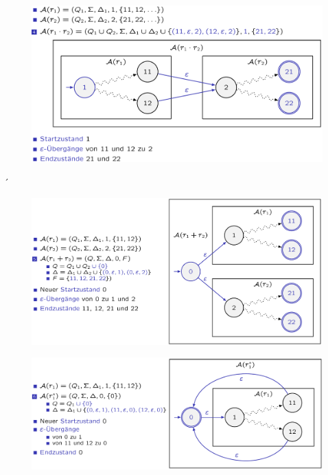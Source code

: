 \documentclass[12pt,a4paper]{article}
\begin{document}
\begin{center}
	\begin{figure}[!h]
		\includegraphics[width=\textwidth]{Bilder/KonkatenationNEA.png}
	\end{figure}
\end{center}´
\begin{center}
	\begin{figure}[!h]
		\includegraphics[width=\textwidth]{Bilder/VereinigungNEA.png}
	\end{figure}
\end{center}

\begin{center}
	\begin{figure}[!h]
		\includegraphics[width=\textwidth]{Bilder/KleeneNEA.png}
	\end{figure}
\end{center}
\end{document}

